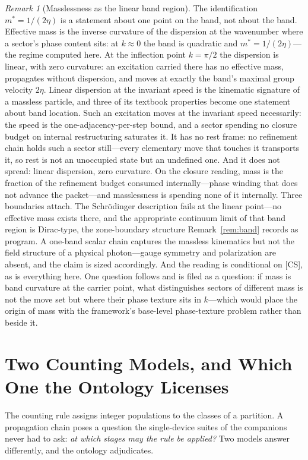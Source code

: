 \documentclass[11pt]{article}
\theoremstyle{definition}
\theoremstyle{remark}
\newtheorem{remark}{Remark}
\begin{document}
\begin{remark}[Masslessness as the linear band region]\label{rem:massless}
The identification $m^\ast = 1/(2\eta)$ is a statement about one point on the band, not about the band. Effective mass is the inverse curvature of the dispersion at the wavenumber where a sector's phase content sits: at $k \approx 0$ the band is quadratic and $m^\ast = 1/(2\eta)$---the regime computed here. At the inflection point $k = \pi/2$ the dispersion is linear, with zero curvature: an excitation carried there has no effective mass, propagates without dispersion, and moves at exactly the band's maximal group velocity $2\eta$. Linear dispersion at the invariant speed is the kinematic signature of a massless particle, and three of its textbook properties become one statement about band location. Such an excitation moves at the invariant speed necessarily: the speed is the one-adjacency-per-step bound, and a sector spending no closure budget on internal restructuring saturates it. It has no rest frame: no refinement chain holds such a sector still---every elementary move that touches it transports it, so rest is not an unoccupied state but an undefined one. And it does not spread: linear dispersion, zero curvature. On the closure reading, mass is the fraction of the refinement budget consumed internally---phase winding that does not advance the packet---and masslessness is spending none of it internally. Three boundaries attach. The Schr\"odinger description fails at the linear point---no effective mass exists there, and the appropriate continuum limit of that band region is Dirac-type, the zone-boundary structure Remark~\ref{rem:band} records as program. A one-band scalar chain captures the massless kinematics but not the field structure of a physical photon---gauge symmetry and polarization are absent, and the claim is sized accordingly. And the reading is conditional on [CS], as is everything here. One question follows and is filed as a question: if mass is band curvature at the carrier point, what distinguishes sectors of different mass is not the move set but where their phase texture sits in $k$---which would place the origin of mass with the framework's base-level phase-texture problem rather than beside it.
\end{remark}

\section{Two Counting Models, and Which One the Ontology Licenses}\label{sec:models}
The counting rule assigns integer populations to the classes of a partition. A propagation chain poses a question the single-device suites of the companions never had to ask: \emph{at which stages may the rule be applied?} Two models answer differently, and the ontology adjudicates.
\end{document}
